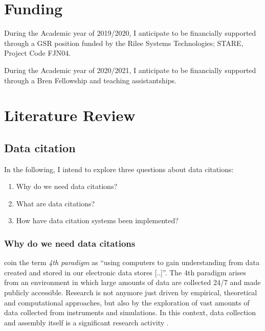\documentclass[letterpaper, parskip=half]{scrartcl}
\begin{document}
\section{Funding}
During the Academic year of 2019/2020, I anticipate to be financially supported through a GSR position funded by the Rilee Systems Technologies; STARE, Project Code FJN04.

During the Academic year of 2020/2021, I anticipate to be financially supported through a Bren Fellowship and teaching assistantships.




\newpage
\section{Literature Review}

\subsection{Data citation}
In the following, I intend to explore three questions about data citations:

\begin{enumerate}
 \item Why do we need data citations?
 \item What are data citations?
 \item How have data citation systems been implemented?
\end{enumerate}

\subsubsection{Why do we need data citations}    
\cite{Hey2009} coin the term \textit{4th paradigm} as ``using computers to gain understanding from data created and stored in our electronic data stores [..]''.
The 4th paradigm arises from an environment in which large amounts of data are collected 24/7 and made publicly accessible. Research is not anymore just driven by empirical, theoretical and computational approaches, but also by the exploration of vast amounts of data collected from instruments and simulations. In this context, data collection and assembly itself is a significant research activity \citep{Frew2012}.
\end{document}
